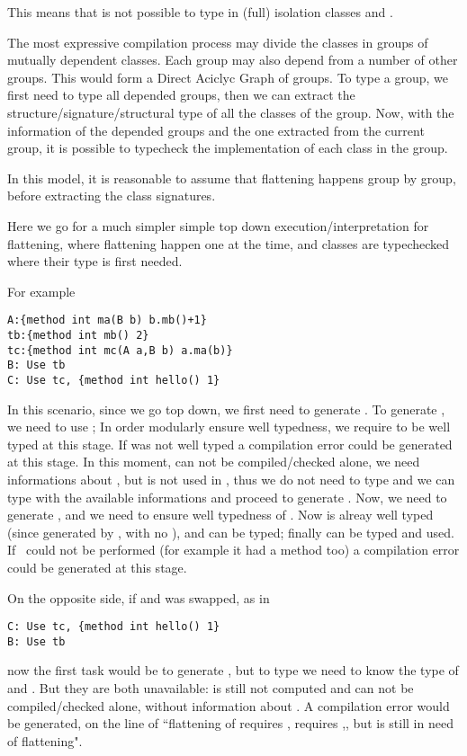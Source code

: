 This means that is not possible to type in (full) isolation classes
\Q@String@ and \Q@Int@.

The most expressive compilation process may divide the classes in groups of mutually 
dependent classes.
Each group may also depend from a number of other groups.
This would form a Direct Aciclyc Graph of groups.
To type a group, we first need to type all depended groups, then
we can extract the structure/signature/structural type of all
the classes of the group.
Now, with the information of the depended groups and the one extracted
from the current group, it is possible to typecheck the implementation
 of each class in the group.

In this model, it is reasonable to assume that flattening happens group by group, before
extracting the class signatures.

Here we go for a much simpler simple top down execution/interpretation for flattening, where flattening
happen one at the time, and classes are typechecked where their type is first needed.

For example
\begin{lstlisting}
A:{method int ma(B b) b.mb()+1}
tb:{method int mb() 2}
tc:{method int mc(A a,B b) a.ma(b)}
B: Use tb
C: Use tc, {method int hello() 1}
\end{lstlisting}
In this scenario, since we go top down, we first need to generate \Q@B@.
To generate \Q@B@, we need to use \Q@tb@;
In order modularly ensure well typedness,
we require \Q@tb@ to be well typed at this stage. If \Q@tb@ was not well typed
a compilation error could be generated at this stage.
In this moment, \Q@A@ can not be compiled/checked alone,
we need informations about \Q@B@, but \Q@A@ is not used in \Q@tb@,
thus we do not need to type \Q@A@ and we can type \Q@tb@ with
 the available informations and proceed to generate \Q@B@.
Now, we need to generate \Q@C@, and we need to ensure well typedness of \Q@tc@.
Now \Q@B@ is alreay well typed (since generated by \use \Q@tb@, with no \mL),
and \Q@A@ can be typed;  finally \Q@tc@ can be typed and used.
If \use\ could not be performed (for example it \Q@tc@ had a method \Q@hello@ too)
a compilation error could be generated at this stage.

On the opposite side, if \Q@B@ and \Q@C@ was swapped, as in
\begin{lstlisting}
C: Use tc, {method int hello() 1}  
B: Use tb
\end{lstlisting}

now the first task would be to generate \Q@C@, but 
to type \Q@tc@ we need to know the type of \Q@A@ and \Q@B@.
But they are both unavailable: \Q@B@ is still not computed and 
\Q@A@ can not be compiled/checked alone, without information about \Q@B@.
A compilation error would be generated, on the line of ``flattening of \Q@C@
requires \Q@tc@, \Q@tc@ requires \Q@A@,\Q@B@, but \Q@B@ is still in need of flattening".

